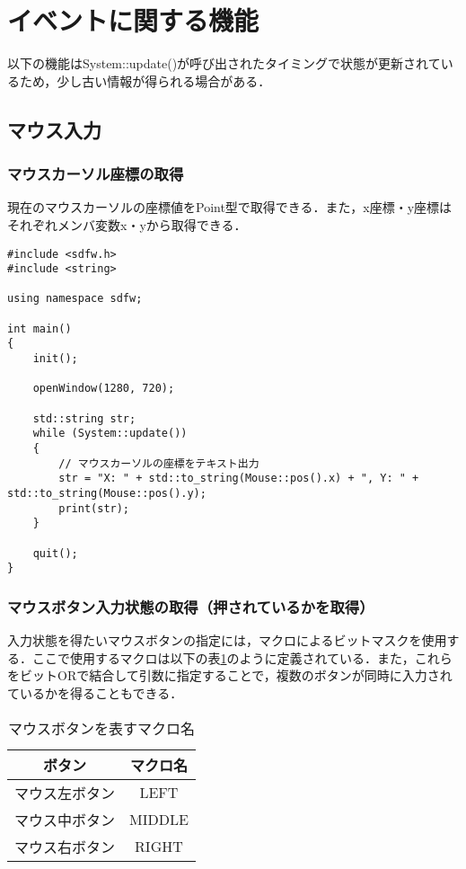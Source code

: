 \documentclass[a4paper, 11pt, oneside, onecolumn, openany]{jsarticle}
\begin{document}
\section{イベントに関する機能}
以下の機能はSystem::update()が呼び出されたタイミングで状態が更新されているため，少し古い情報が得られる場合がある．
\subsection{マウス入力}
\subsubsection{マウスカーソル座標の取得}
現在のマウスカーソルの座標値をPoint型で取得できる．また，x座標・y座標はそれぞれメンバ変数x・yから取得できる．
\begin{lstlisting}[caption=使用例, label=macro-GetMouseButtonState, keepspaces=true]
#include <sdfw.h>
#include <string>

using namespace sdfw;

int main()
{
    init();

    openWindow(1280, 720);

    std::string str;
    while (System::update())
    {
        // マウスカーソルの座標をテキスト出力
        str = "X: " + std::to_string(Mouse::pos().x) + ", Y: " + std::to_string(Mouse::pos().y);
        print(str);
    }

    quit();
}
\end{lstlisting}

\subsubsection{マウスボタン入力状態の取得（押されているかを取得）}
入力状態を得たいマウスボタンの指定には，マクロによるビットマスクを使用する．ここで使用するマクロは以下の表\ref{macro-MouseButton}のように定義されている．また，これらをビットORで結合して引数に指定することで，複数のボタンが同時に入力されているかを得ることもできる．
\begin{table}[H]
  \caption{マウスボタンを表すマクロ名}
  \label{macro-MouseButton}
  \centering
  \begin{tabular}{cc}
    \hline
    ボタン & マクロ名 \\
    \hline \hline
    マウス左ボタン & LEFT \\
    マウス中ボタン & MIDDLE \\
    マウス右ボタン & RIGHT \\
    \hline
  \end{tabular}
\end{table}
\end{document}
